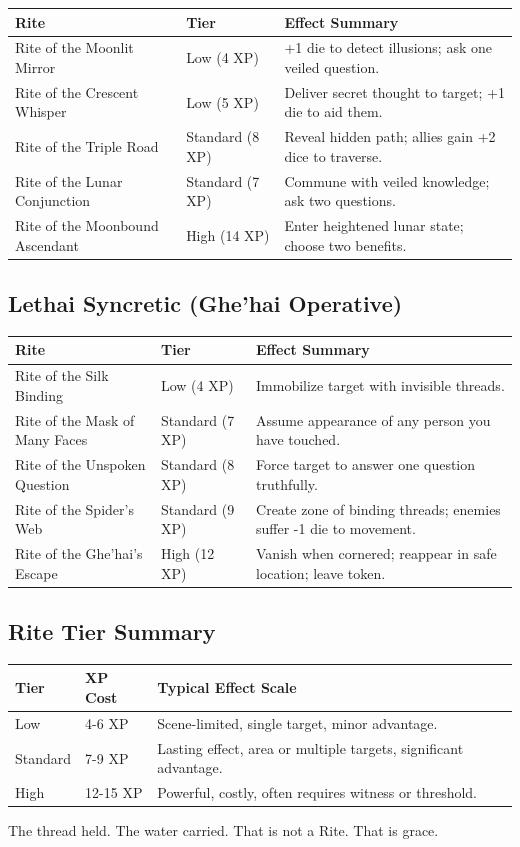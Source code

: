 \begin{longtable}{p{} p{} p{}}
\hline
\textbf{Rite} & \textbf{Tier} & \textbf{Effect Summary} \\
\hline
Rite of the Moonlit Mirror & Low (4 XP) & +1 die to detect illusions; ask one veiled question. \\
Rite of the Crescent Whisper & Low (5 XP) & Deliver secret thought to target; +1 die to aid them. \\
Rite of the Triple Road & Standard (8 XP) & Reveal hidden path; allies gain +2 dice to traverse. \\
Rite of the Lunar Conjunction & Standard (7 XP) & Commune with veiled knowledge; ask two questions. \\
Rite of the Moonbound Ascendant & High (14 XP) & Enter heightened lunar state; choose two benefits. \\
\hline
\end{longtable}

\subsection{Lethai Syncretic (Ghe'hai Operative)}

\begin{longtable}{p{} p{} p{}}
\hline
\textbf{Rite} & \textbf{Tier} & \textbf{Effect Summary} \\
\hline
Rite of the Silk Binding & Low (4 XP) & Immobilize target with invisible threads. \\
Rite of the Mask of Many Faces & Standard (7 XP) & Assume appearance of any person you have touched. \\
Rite of the Unspoken Question & Standard (8 XP) & Force target to answer one question truthfully. \\
Rite of the Spider's Web & Standard (9 XP) & Create zone of binding threads; enemies suffer -1 die to movement. \\
Rite of the Ghe'hai's Escape & High (12 XP) & Vanish when cornered; reappear in safe location; leave token. \\
\hline
\end{longtable}

\subsection{Rite Tier Summary}

\begin{longtable}{p{} p{} p{}}
\hline
\textbf{Tier} & \textbf{XP Cost} & \textbf{Typical Effect Scale} \\
\hline
Low & 4-6 XP & Scene-limited, single target, minor advantage. \\
Standard & 7-9 XP & Lasting effect, area or multiple targets, significant advantage. \\
High & 12-15 XP & Powerful, costly, often requires witness or threshold. \\
\hline
\end{longtable}

The thread held. The water carried. That is not a Rite. That is grace.
